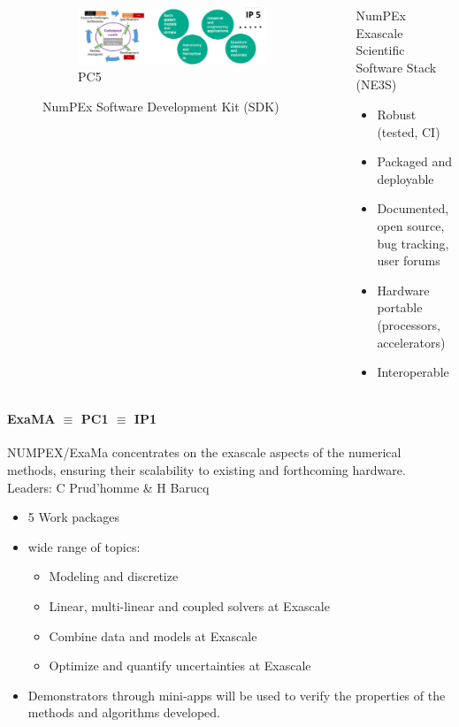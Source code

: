 \begin{frame}
\begin{columns}[t]
\begin{column}{.5\textwidth}
\begin{figure}[ht]
\begin{subfigure}{.9\textwidth}
            \includegraphics[width=\textwidth]{../figures/numpex-ip5-1.png}
            \caption{PC5}
          \end{subfigure}
         \caption{NumPEx Software Development Kit (SDK)}%
         \label{some-label}%
        \end{figure}
    \end{column}
    \begin{column}{0.5\textwidth}
       \begin{alertblock}{NumPEx Exascale Scientific Software Stack (NE3S)}
         \begin{itemize}
           \item Robust (tested, CI)
           \item Packaged and deployable
           \item Documented, open source, bug          tracking, user forums
           \item Hardware portable (processors,  accelerators)
           \item Interoperable
         \end{itemize}
       \end{alertblock}
    \end{column}
    
    \end{columns}


\end{frame}
\begin{frame}{\insertsectionhead}
  \framesubtitle{ExaMA $\equiv$ PC1 $\equiv$ IP1}
  NUMPEX/ExaMa concentrates on the exascale aspects of the numerical methods, ensuring their scalability to existing and forthcoming hardware.
  \vfill
  Leaders: C Prud'homme \& H Barucq
  \begin{itemize}
    \item 5 Work packages
    \item wide range of topics: 
    \begin{itemize}
        \item Modeling and discretize
        \item Linear, multi-linear and coupled solvers at Exascale
        \item Combine data and  models at Exascale
        \item Optimize and quantify uncertainties at Exascale
    \end{itemize}
    \item Demonstrators through mini-apps will be used to verify the properties of the methods and algorithms developed.
  \end{itemize}
\end{frame}

